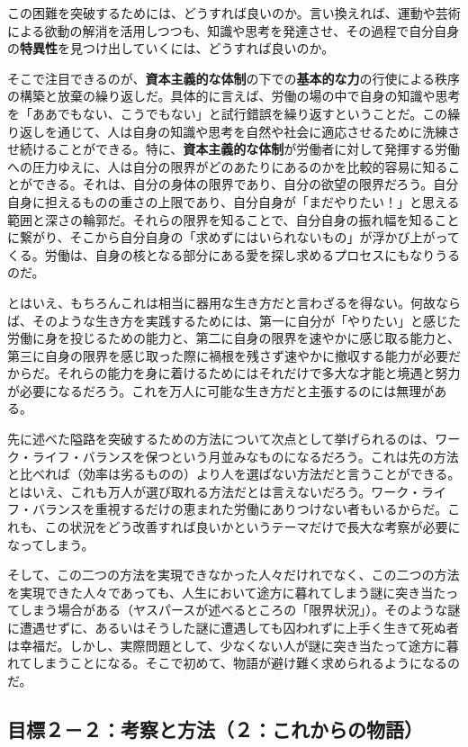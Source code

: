 この困難を突破するためには、どうすれば良いのか。言い換えれば、運動や芸術による欲動の解消を活用しつつも、知識や思考を発達させ、その過程で自分自身の\textbf{特異性}を見つけ出していくには、どうすれば良いのか。

そこで注目できるのが、\textbf{資本主義的な体制}の下での\textbf{基本的な力}の行使による秩序の構築と放棄の繰り返しだ。具体的に言えば、労働の場の中で自身の知識や思考を「ああでもない、こうでもない」と試行錯誤を繰り返すということだ。この繰り返しを通じて、人は自身の知識や思考を自然や社会に適応させるために洗練させ続けることができる。特に、\textbf{資本主義的な体制}が労働者に対して発揮する労働への圧力ゆえに、人は自分の限界がどのあたりにあるのかを比較的容易に知ることができる。それは、自分の身体の限界であり、自分の欲望の限界だろう。自分自身に担えるものの重さの上限であり、自分自身が「まだやりたい！」と思える範囲と深さの輪郭だ。それらの限界を知ることで、自分自身の振れ幅を知ることに繋がり、そこから自分自身の「求めずにはいられないもの」が浮かび上がってくる。労働は、自身の核となる部分にある愛を探し求めるプロセスにもなりうるのだ。

とはいえ、もちろんこれは相当に器用な生き方だと言わざるを得ない。何故ならば、そのような生き方を実践するためには、第一に自分が「やりたい」と感じた労働に身を投じるための能力と、第二に自身の限界を速やかに感じ取る能力と、第三に自身の限界を感じ取った際に禍根を残さず速やかに撤収する能力が必要だからだ。それらの能力を身に着けるためにはそれだけで多大な才能と境遇と努力が必要になるだろう。これを万人に可能な生き方だと主張するのには無理がある。

先に述べた隘路を突破するための方法について次点として挙げられるのは、ワーク・ライフ・バランスを保つという月並みなものになるだろう。これは先の方法と比べれば（効率は劣るものの）より人を選ばない方法だと言うことができる。とはいえ、これも万人が選び取れる方法だとは言えないだろう。ワーク・ライフ・バランスを重視するだけの恵まれた労働にありつけない者もいるからだ。これも、この状況をどう改善すれば良いかというテーマだけで長大な考察が必要になってしまう。

そして、この二つの方法を実現できなかった人々だけれでなく、この二つの方法を実現できた人々であっても、人生において途方に暮れてしまう謎に突き当たってしまう場合がある（ヤスパースが述べるところの「限界状況」）。そのような謎に遭遇せずに、あるいはそうした謎に遭遇しても囚われずに上手く生きて死ぬ者は幸福だ。しかし、実際問題として、少なくない人が謎に突き当たって途方に暮れてしまうことになる。そこで初めて、物語が避け難く求められるようになるのだ。

\subsection{目標２－２：考察と方法（２：これからの物語）}\label{ux76eeux6a19uxff12uxff12ux8003ux5bdfux3068ux65b9ux6cd5uxff12ux3053ux308cux304bux3089ux306eux7269ux8a9e}

